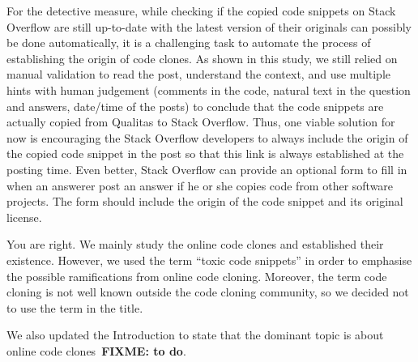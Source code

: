 \documentclass[a4paper,twoside,10pt]{reviewresponse}
\newcommand\FIXME[1]{{\color{red}\textbf{FIXME: #1}}}
\begin{document}
For the detective measure, while checking if the copied code snippets on Stack Overflow are still up-to-date with the latest version of their originals can possibly be done automatically, it is a challenging task to automate the process of establishing the origin of code clones. As shown in this study, we still relied on manual validation to read the post, understand the context, and use multiple hints with human judgement (comments in the code, natural text in the question and answers, date/time of the posts) to conclude that the code snippets are actually copied from Qualitas to Stack Overflow. Thus, one viable solution for now is encouraging the Stack Overflow developers to always include the origin of the copied code snippet in the post so that this link is always established at the posting time. Even better, Stack Overflow can provide an optional form to fill in when an answerer post an answer if he or she copies code from other software projects. The form should include the origin of the code snippet and its original license.


You are right. We mainly study the online code clones and established their existence. However, we used the term ``toxic code snippets'' in order to emphasise the possible ramifications from online code cloning. 
Moreover, the term code cloning is not well known outside the code cloning community, so we decided not to use the term in the title. 

We also updated the Introduction to state that the dominant topic is about online code clones~\FIXME{to do}.

\end{document}
